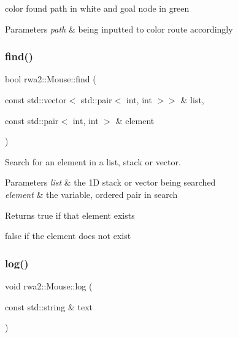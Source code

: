 color found path in white and goal node in green 


\begin{DoxyParams}{Parameters}
{\em path} & being inputted to color route accordingly \\
\hline
\end{DoxyParams}
\mbox{\label{classrwa2_1_1_mouse_a5de2232aada66b8fa3a640fcb0554761}} 
\subsubsection{\texorpdfstring{find()}{find()}}
{\footnotesize\ttfamily bool rwa2\+::\+Mouse\+::find (\begin{DoxyParamCaption}\item[{const std\+::vector$<$ std\+::pair$<$ int, int $>$$>$ \&}]{list,  }\item[{const std\+::pair$<$ int, int $>$ \&}]{element }\end{DoxyParamCaption})}



Search for an element in a list, stack or vector. 


\begin{DoxyParams}{Parameters}
{\em list} & the 1D stack or vector being searched \\
\hline
{\em element} & the variable, ordered pair in search\\
\hline
\end{DoxyParams}
\begin{DoxyReturn}{Returns}
true if that element exists 

false if the element does not exist 
\end{DoxyReturn}
\mbox{\label{classrwa2_1_1_mouse_a6bbb329ddb93efbab9f7c91134cc1d44}} 
\subsubsection{\texorpdfstring{log()}{log()}}
{\footnotesize\ttfamily void rwa2\+::\+Mouse\+::log (\begin{DoxyParamCaption}\item[{const std\+::string \&}]{text }\end{DoxyParamCaption})}



